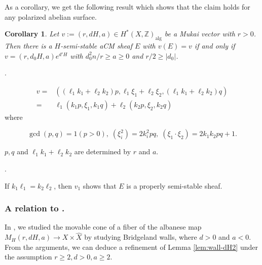 \documentclass[10pt]{amsart}
\def\Bbb{\mathbb}
\newenvironment{NB}{
\color{red}{\bf NB}. \footnotesize 
}{}
\newcommand{\alg}{\operatorname{alg}}
\numberwithin{equation}{section}
\theoremstyle{plain}
\newtheorem{cor}[thm]{Corollary}
\theoremstyle{definition}
\theoremstyle{remark}
\begin{document}
As a corollary, we get the following result which
shows that the claim \cite[Thm. 0.2]{Y:aCM-abel} holds for
any polarized abelian surface.


\begin{cor}
Let $v:=(r,dH,a) \in H^*(X,{\Bbb Z})_{\alg}$ be a Mukai vector with $r>0$.
Then there is a $H$-semi-stable aCM sheaf $E$ with $v(E)=v$ if and only if
$v=(r,d_0 H,a)e^{d'H}$ with
$d_0^2 n/r \geq a \geq 0$ and $r/2 \geq |d_0|$.
\end{cor}






 






\begin{NB}
\begin{equation}
\begin{split}
v=&((\ell_1 k_1+\ell_2 k_2)p,\ell_1 \xi_1+\ell_2 \xi_2,(\ell_1 k_1+\ell_2 k_2)q)\\
=& \ell_1(k_1 p,\xi_1,k_1 q)+\ell_2 (k_2 p,\xi_2,k_2 q)
\end{split}
\end{equation}
where %


\begin{equation}
\gcd(p,q)=1 (p>0),\;
(\xi_i^2)=2k_i^2 pq,\; (\xi_1 \cdot \xi_2)=2k_1 k_2 pq+1.
\end{equation}

$p,q$ and $\ell_1 k_1+\ell_2 k_2$ are determined by $r$ and $a$.
\end{NB}

\begin{NB}
If $k_1 \ell_1=k_2 \ell_2$, then $v_1$ shows that $E$ is a properly semi-stable sheaf.
\end{NB}



\subsubsection{A relation to \cite{BMOY}.}
In \cite{BMOY}, we studied the movable cone of a fiber
of the albanese map $M_H(r,dH,a) \to X \times \widehat{X}$ by
studying Bridgeland walls,
where $d>0$ and $a<0$.
From the arguments, we can deduce a refinement of 
Lemma \ref{lem:wall-dH2} under the assumption $r \geq 2, d>0,a \geq 2$.
\end{document}
